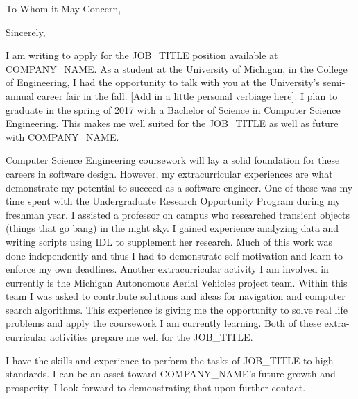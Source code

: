 \documentclass[11pt,a4paper]{moderncv}
\begin{document}
\date{\today}
\opening{To Whom it May Concern,}
\closing{Sincerely,}
\makelettertitle

I am writing to apply for the JOB\_TITLE position available at COMPANY\_NAME. As a student at the University of Michigan, in the College of Engineering, I had the opportunity to talk with you at the University’s semi-annual career fair in the fall. [Add in a little personal verbiage here]. I plan to graduate in the spring of 2017 with a Bachelor of Science in Computer Science Engineering. This makes me well suited for the JOB\_TITLE as well as future with COMPANY\_NAME.

Computer Science Engineering coursework will lay a solid foundation for these careers in software design. However, my extracurricular experiences are what demonstrate my potential to succeed as a software engineer. One of these was my time spent with the Undergraduate Research Opportunity Program during my freshman year. I assisted a professor on campus who researched transient objects (things that go bang) in the night sky. I gained experience analyzing data and writing scripts using IDL to supplement her research. Much of this work was done independently and thus I had to demonstrate self-motivation and learn to enforce my own deadlines. Another extracurricular activity I am involved in currently is the Michigan Autonomous Aerial Vehicles project team. Within this team I was asked to contribute solutions and ideas for navigation and computer search algorithms. This experience is giving me the opportunity to solve real life problems and apply the coursework I am currently learning. Both of these extra-curricular activities prepare me well for the JOB\_TITLE.

I have the skills and experience to perform the tasks of JOB\_TITLE to high standards. I can be an asset toward COMPANY\_NAME's future growth and prosperity. I look forward to demonstrating that upon further contact.

\makeletterclosing
\end{document}
